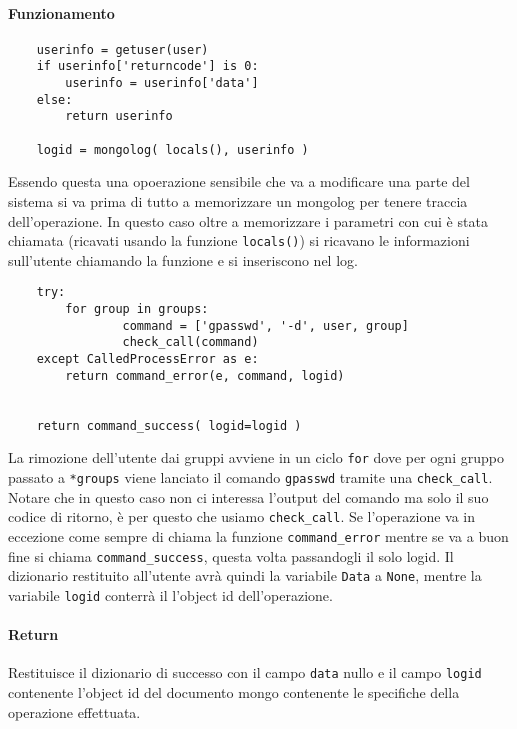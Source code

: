 \documentclass[11pt]{article}
\begin{document}
\paragraph{Funzionamento}
\begin{lstlisting}
    userinfo = getuser(user)
    if userinfo['returncode'] is 0:
        userinfo = userinfo['data']
    else:
        return userinfo

    logid = mongolog( locals(), userinfo )
\end{lstlisting}
Essendo questa una opoerazione sensibile che va a modificare una parte del sistema si va prima di tutto a memorizzare
un mongolog  per tenere traccia dell'operazione. In questo caso oltre a memorizzare i parametri con cui è stata
chiamata (ricavati usando la funzione \texttt{locals()}) si ricavano le informazioni sull'utente chiamando
la funzione  e si inseriscono nel log.
\begin{lstlisting}
    try:
    	for group in groups:
                command = ['gpasswd', '-d', user, group]
                check_call(command)
    except CalledProcessError as e:
        return command_error(e, command, logid)
    
    
    return command_success( logid=logid )
\end{lstlisting}
La rimozione dell'utente dai gruppi avviene in un ciclo \texttt{for} dove per ogni gruppo passato a \texttt{*groups}
viene lanciato il comando \texttt{gpasswd} tramite una \texttt{check\_call}. Notare che in questo caso non ci interessa
l'output del comando ma solo il suo codice di ritorno, è per questo che usiamo \texttt{check\_call}.
Se l'operazione va in eccezione come sempre di chiama la funzione \texttt{command\_error} mentre se va a buon fine
si chiama \texttt{command\_success}, questa volta passandogli il solo logid. Il dizionario restituito all'utente
avrà quindi la variabile \texttt{Data} a \texttt{None}, mentre la variabile \texttt{logid} conterrà il l'object id
dell'operazione.
\paragraph{Return}
Restituisce il dizionario di successo con il campo \texttt{data} nullo e il campo \texttt{logid} contenente l'object id
del documento mongo contenente le specifiche della operazione effettuata.
\end{document}
